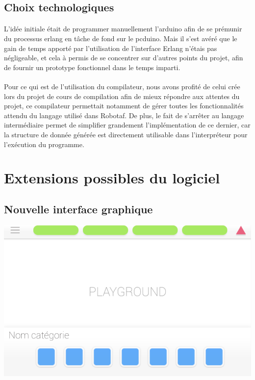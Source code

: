 \documentclass[a4paper]{article}
\begin{document}
\subsection{Choix technologiques}
\paragraph{}
L’idée initiale était de programmer manuellement l’arduino afin de se prémunir du processus erlang en tâche de fond sur le pcduino. Mais il s’est avéré que le gain de temps apporté par l’utilisation de l’interface Erlang n’étais pas négligeable, et cela à permis de se concentrer sur d’autres points du projet, afin de fournir un prototype fonctionnel dans le temps imparti.

\paragraph{}
Pour ce qui est de l’utilisation du compilateur, nous avons profité de celui crée lors du projet de cours de compilation afin de mieux répondre aux attentes du projet, ce compilateur permettait notamment de gérer toutes les fonctionnalités attendu du langage utilisé dans Robotaf. De plus, le fait de s'arrêter au langage intermédiaire permet de simplifier grandement l'implémentation de ce dernier, car la structure de donnée générée est directement utilisable dans l'interpréteur pour l'exécution du programme.

\section{Extensions possibles du logiciel}
\subsection{Nouvelle interface graphique}

\begin{center}
\includegraphics[scale=0.3]{img/new_ui.png}
\end{center}
\end{document}
